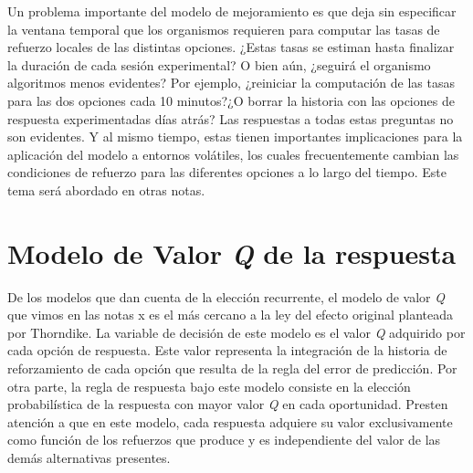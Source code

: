 \documentclass[
  letterpaper,
]{book}
\begin{document}
Un problema importante del modelo de mejoramiento es que deja sin
especificar la ventana temporal que los organismos requieren para
computar las tasas de refuerzo locales de las distintas opciones. ¿Estas
tasas se estiman hasta finalizar la duración de cada sesión
experimental? O bien aún, ¿seguirá el organismo algoritmos menos
evidentes? Por ejemplo, ¿reiniciar la computación de las tasas para las
dos opciones cada 10 minutos?¿O borrar la historia con las opciones de
respuesta experimentadas días atrás? Las respuestas a todas estas
preguntas no son evidentes. Y al mismo tiempo, estas tienen importantes
implicaciones para la aplicación del modelo a entornos volátiles, los
cuales frecuentemente cambian las condiciones de refuerzo para las
diferentes opciones a lo largo del tiempo. Este tema será abordado en
otras notas.

\section{\texorpdfstring{Modelo de Valor \emph{Q} de la
respuesta}{Modelo de Valor Q de la respuesta}}\label{modelo-de-valor-q-de-la-respuesta}

De los modelos que dan cuenta de la elección recurrente, el modelo de
valor \emph{Q} que vimos en las notas x es el más cercano a la ley del
efecto original planteada por Thorndike. La variable de decisión de este
modelo es el valor \emph{Q} adquirido por cada opción de respuesta. Este
valor representa la integración de la historia de reforzamiento de cada
opción que resulta de la regla del error de predicción. Por otra parte,
la regla de respuesta bajo este modelo consiste en la elección
probabilística de la respuesta con mayor valor \emph{Q} en cada
oportunidad. Presten atención a que en este modelo, cada respuesta
adquiere su valor exclusivamente como función de los refuerzos que
produce y es independiente del valor de las demás alternativas
presentes.
\end{document}
